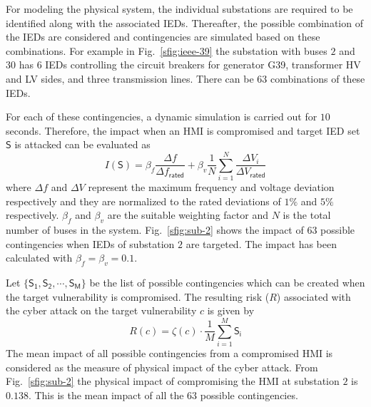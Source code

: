 For modeling the physical system, the individual substations are required to be identified along with the associated IEDs. Thereafter, the possible combination of the IEDs are considered and contingencies are simulated based on these combinations. For example in Fig.~\ref{sfig:ieee-39} the substation with buses $2$ and $30$ has $6$ IEDs controlling the circuit breakers for generator G39, transformer HV and LV sides, and three transmission lines. There can be 63 combinations of these IEDs.

For each of these contingencies, a dynamic simulation is carried out for $10$ seconds. Therefore, the impact when an HMI is compromised and target IED set $\mathsf{S}$ is attacked can be evaluated as
\begin{equation}
I(\mathsf{S})=\beta_f\dfrac{\Delta f}{\Delta f_{\mathsf{rated}}}+\beta_v\frac{1}{N}\sum_{i=1}^{N}\dfrac{\Delta V_i}{\Delta V_{\mathsf{rated}}}
\end{equation} 
where $\Delta f$ and $\Delta V$ represent the maximum frequency and voltage deviation respectively and they are normalized to the rated deviations of $1\%$ and $5\%$ respectively. $\beta_f$ and $\beta_v$ are the suitable weighting factor and $N$ is the total number of buses in the system. Fig.~\ref{sfig:sub-2} shows the impact of $63$ possible contingencies when IEDs of substation $2$ are targeted. The impact has been calculated with $\beta_f=\beta_v=0.1$.

Let $\{\mathsf{S_1},\mathsf{S_2},\cdots,\mathsf{S_M}\}$ be the list of possible contingencies which can be created when the target vulnerability is compromised. The resulting risk ($R$) associated with the cyber attack on the target vulnerability $c$ is given by
\begin{equation}
R(c)=\zeta(c)\cdot\dfrac{1}{M}\sum_{i=1}^{M}\mathsf{S_i}
\end{equation}
The mean impact of all possible contingencies from a compromised HMI is considered as the measure of physical impact of the cyber attack. From Fig.~\ref{sfig:sub-2} the physical impact of compromising the HMI at substation $2$ is $0.138$. This is the mean impact of all the $63$ possible contingencies.